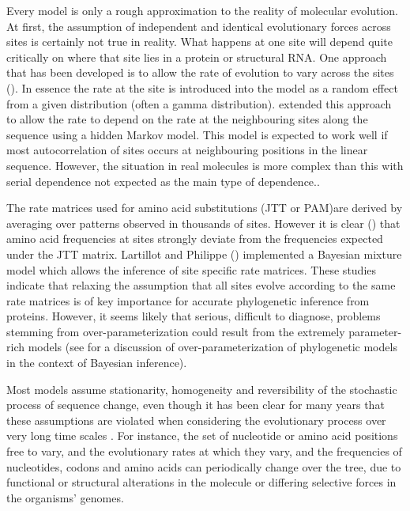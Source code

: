 Every model is only a rough approximation to the reality of molecular evolution. At first, the assumption of independent and identical evolutionary forces across sites is certainly not true in reality. What happens at one site will depend quite critically on where that site lies in a protein or structural RNA. One approach that has been developed is to allow the rate of evolution to vary across the sites (\cite{goldman1994codon}). In essence the rate at the site is introduced into the model as a random effect from a given distribution (often a gamma distribution). \cite{felsenstein1996hidden} extended this approach to allow the rate to depend on the rate at the neighbouring sites along the sequence using a hidden Markov model. This model is expected to work well if most autocorrelation of sites occurs at neighbouring positions in the linear sequence. However, the situation in real molecules is more complex than this with serial dependence not expected as the main type of dependence.. 

The rate matrices used for amino acid substitutions (JTT or PAM)are derived by averaging over patterns observed in thousands of sites. However it is clear (\cite{halpern1998evolutionary,parisi2001structural,susko2002testing}) that amino acid frequencies at sites strongly deviate from the frequencies expected under the JTT matrix.  Lartillot and Philippe (\cite{lartillot2004bayesian}) implemented a Bayesian mixture model which allows the inference of site specific rate matrices. These studies indicate that relaxing the assumption that all sites evolve according to the same rate matrices is of key importance for accurate phylogenetic inference from proteins. However, it seems likely that serious, difficult to diagnose, problems stemming from over-parameterization could result from the extremely parameter-rich models (see \cite{rannala2002identifiability} for a  discussion of over-parameterization of phylogenetic models in the context of Bayesian inference).

Most models  assume stationarity, homogeneity and reversibility of the stochastic process of sequence change, even though it has been clear for many years that these assumptions are violated when considering the evolutionary process over very long time scales \citep{boussau2006efficient}. For instance, the set of nucleotide or amino acid positions free to vary, and the evolutionary rates at which they vary, and the frequencies of nucleotides, codons and amino acids can periodically change over the tree, due to functional or structural alterations in the molecule or differing selective forces in the organisms' genomes.

